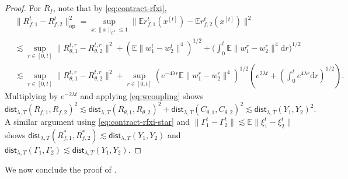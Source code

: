 \documentclass[11pt,letterpaper,reqno]{amsart}
\theoremstyle{definition}
\def\d{\mathrm{d}}
\def\E{\mathbb{E}}
\newcommand{\lbddst}[2]{\mathsf{dist}_{\lambda,T}(#1,#2)}
\newcommand{\normop}[1]{\|#1\|_{\mathrm{op}}}
\begin{document}
\begin{proof}
For $R_f$, note that by \eqref{eq:contract-rfxi},
\begin{align*}
&\normop{R_{f,1}^t-R_{f,2}^t}^2
=\sup_{x:\|x\|_{L^4} \leq 1}
\|\E r_{f,1}^t(x^{[t]})-\E r_{f,2}^t(x^{[t]})\|^2\\
&\lesssim \sup_{r \in [0,t]}
\|R_{\theta,1}^{t,r}-R_{\theta,2}^{t,r}\|^2
+(\E\|w_1^t-w_2^t\|^4)^{1/2}
+\Big(\int_0^t \E\|w_1^r-w_2^r\|^4 \d r\Big)^{1/2}\\
&\lesssim \sup_{r \in [0,t]}
\|R_{\theta,1}^{t,r}-R_{\theta,2}^{t,r}\|^2
+\sup_{r \in [0,t]} 
(e^{-4\lambda r}\E \|w_1^r-w_2^r\|^4)^{1/2}
\left(e^{2\lambda t}+\left(\int_0^t e^{4\lambda r}\d r\right)^{1/2}\right).
\end{align*}
Multiplying by $e^{-2\lambda t}$ and applying \eqref{eq:wcoupling} shows
\[\lbddst{R_{f,1}}{R_{f,2}}^2
\lesssim
\lbddst{R_{\theta,1}}{R_{\theta,2}}^2+\lbddst{C_{\theta,1}}{C_{\theta,2}}^2
\lesssim \lbddst{Y_1}{Y_2}^2.\]
A similar argument using \eqref{eq:contract-rfxi-star} 
and $\|\Gamma_1^t-\Gamma_2^t\| \lesssim \E\|\xi_1^t-\xi_2^t\|$ shows
$\lbddst{R_{f,1}^*}{R_{f,2}^*} \lesssim \lbddst{Y_1}{Y_2}$
and $\lbddst{\Gamma_1}{\Gamma_2} \lesssim \lbddst{Y_1}{Y_2}$.
\end{proof}

We now conclude the proof of .
\end{document}
